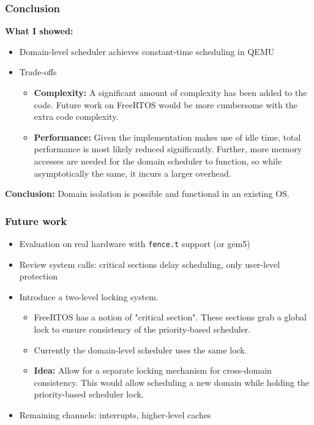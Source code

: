 \begin{frame}
	\frametitle{Conclusion}
	\textbf{What I showed:}
	\begin{itemize}
		\item Domain-level scheduler achieves constant-time scheduling in QEMU
		\item Trade-offs
		      \begin{itemize}
       \item \textbf{Complexity:} A significant amount of complexity has been added to the code. Future work on FreeRTOS would be more cumbersome with the extra code complexity.
       \item \textbf{Performance:} Given the implementation makes use of idle time, total performance is most likely reduced significantly. Further, more memory accesses are needed for the domain scheduler to function, so while asymptotically the same, it incurs a larger overhead.
		      \end{itemize}
	\end{itemize}

	\textbf{Conclusion:} Domain isolation is possible and functional in
	an existing OS.

\end{frame}

\begin{frame}
	\frametitle{Future work}
	\begin{itemize}
		\item Evaluation on real hardware with \texttt{fence.t} support (or gem5)
		\item Review system calls: critical sections delay scheduling, only user-level protection
       \item Introduce a two-level locking system.
		      \begin{itemize}
			      \item FreeRTOS has a notion of "critical section". These sections grab a
			            global lock to ensure consistency of the priority-based scheduler.
			      \item Currently the domain-level scheduler uses the same lock.
			      \item \textbf{Idea:} Allow for a separate locking mechanism for
			            cross-domain consistency. This would allow scheduling a new domain
			            while holding the priority-based scheduler lock.
		      \end{itemize}

		\item Remaining channels: interrupts, higher-level caches
	\end{itemize}

\end{frame}

